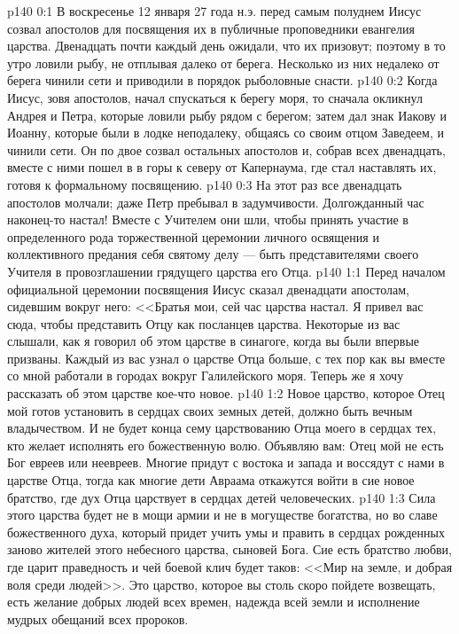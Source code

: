 \vs p140 0:1 В воскресенье 12 января 27 года н.э. перед самым полуднем Иисус созвал апостолов для посвящения их в публичные проповедники евангелия царства. Двенадцать почти каждый день ожидали, что их призовут; поэтому в то утро ловили рыбу, не отплывая далеко от берега. Несколько из них недалеко от берега чинили сети и приводили в порядок рыболовные снасти.
\vs p140 0:2 Когда Иисус, зовя апостолов, начал спускаться к берегу моря, то сначала окликнул Андрея и Петра, которые ловили рыбу рядом с берегом; затем дал знак Иакову и Иоанну, которые были в лодке неподалеку, общаясь со своим отцом Заведеем, и чинили сети. Он по двое созвал остальных апостолов и, собрав всех двенадцать, вместе с ними пошел в в горы к северу от Капернаума, где стал наставлять их, готовя к формальному посвящению.
\vs p140 0:3 На этот раз все двенадцать апостолов молчали; даже Петр пребывал в задумчивости. Долгожданный час наконец\hyp{}то настал! Вместе с Учителем они шли, чтобы принять участие в определенного рода торжественной церемонии личного освящения и коллективного предания себя святому делу --- быть представителями своего Учителя в провозглашении грядущего царства его Отца.
\vs p140 1:1 Перед началом официальной церемонии посвящения Иисус сказал двенадцати апостолам, сидевшим вокруг него: <<Братья мои, сей час царства настал. Я привел вас сюда, чтобы представить Отцу как посланцев царства. Некоторые из вас слышали, как я говорил об этом царстве в синагоге, когда вы были впервые призваны. Каждый из вас узнал о царстве Отца больше, с тех пор как вы вместе со мной работали в городах вокруг Галилейского моря. Теперь же я хочу рассказать об этом царстве кое\hyp{}что новое.
\vs p140 1:2 Новое царство, которое Отец мой готов установить в сердцах своих земных детей, должно быть вечным владычеством. И не будет конца сему царствованию Отца моего в сердцах тех, кто желает исполнять его божественную волю. Объявляю вам: Отец мой не есть Бог евреев или неевреев. Многие придут с востока и запада и воссядут с нами в царстве Отца, тогда как многие дети Авраама откажутся войти в сие новое братство, где дух Отца царствует в сердцах детей человеческих.
\vs p140 1:3 Сила этого царства будет не в мощи армии и не в могуществе богатства, но во славе божественного духа, который придет учить умы и править в сердцах рожденных заново жителей этого небесного царства, сыновей Бога. Сие есть братство любви, где царит праведность и чей боевой клич будет таков: <<Мир на земле, и добрая воля среди людей>>. Это царство, которое вы столь скоро пойдете возвещать, есть желание добрых людей всех времен, надежда всей земли и исполнение мудрых обещаний всех пророков.

